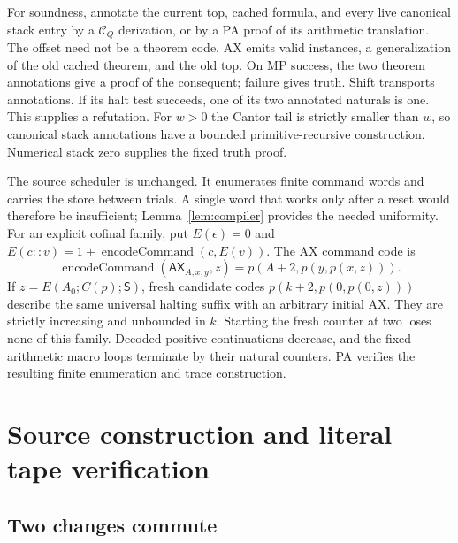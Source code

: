 \documentclass[10pt,letterpaper]{article}
\newcommand{\AX}{\mathsf{AX}}
\newcommand{\Sh}{\mathsf S}
\newcommand{\CQ}{\mathcal C_Q}
\begin{document}
For soundness, annotate the current top, cached formula, and every live
canonical stack entry by a \(\CQ\) derivation, or by a PA proof of its
arithmetic translation. The offset need not be a theorem code. AX emits
valid instances, a generalization of the old cached theorem, and the old
top. On MP success, the two theorem annotations give a proof of the
consequent; failure gives truth. Shift transports annotations. If its halt
test succeeds, one of its two annotated naturals is one. This supplies a
refutation. For \(w>0\) the Cantor tail is strictly smaller than \(w\),
so canonical stack annotations have a bounded primitive-recursive
construction. Numerical stack zero supplies the fixed truth proof.

The source scheduler is unchanged. It enumerates finite command words and
carries the store between trials. A single word that works only after a
reset would therefore be insufficient; Lemma~\ref{lem:compiler} provides
the needed uniformity. For an explicit cofinal family, put
\(E(\epsilon)=0\) and
\(E(c::v)=1+\operatorname{encodeCommand}(c,E(v))\). The AX command code is
\[
 \operatorname{encodeCommand}(\AX_{A,x,y},z)
             =p(A+2,p(y,p(x,z))).
\]
If \(z=E(A_0;C(p);\Sh)\), fresh candidate codes
\(p(k+2,p(0,p(0,z)))\) describe the same universal halting suffix with
an arbitrary initial AX. They are strictly increasing and unbounded in
\(k\). Starting the fresh counter at two loses none of this family.
Decoded positive continuations decrease, and the fixed arithmetic macro
loops terminate by their natural counters. PA verifies the resulting finite
enumeration and trace construction.

\section{Source construction and literal tape verification}\label{sec:physical}

\subsection{Two changes commute}
\end{document}
